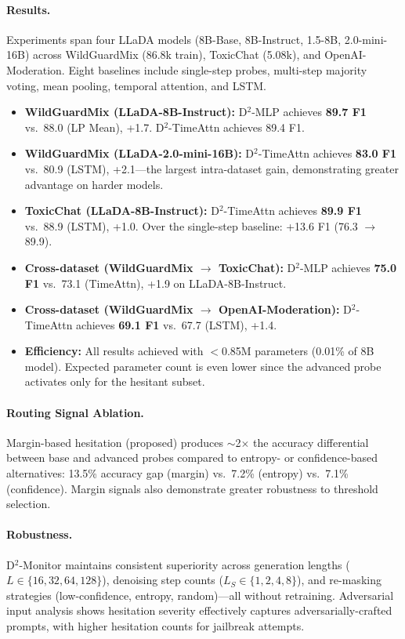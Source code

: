 \documentclass[11pt,a4paper]{article}
\begin{document}
\paragraph{Results.}
Experiments span four LLaDA models (8B-Base, 8B-Instruct, 1.5-8B, 2.0-mini-16B) across WildGuardMix (86.8k train), ToxicChat (5.08k), and OpenAI-Moderation. Eight baselines include single-step probes, multi-step majority voting, mean pooling, temporal attention, and LSTM.

\begin{itemize}[nosep]
    \item \textbf{WildGuardMix (LLaDA-8B-Instruct):} D$^2$-MLP achieves \textbf{89.7 F1} vs.\ 88.0 (LP Mean), +1.7. D$^2$-TimeAttn achieves 89.4 F1.
    \item \textbf{WildGuardMix (LLaDA-2.0-mini-16B):} D$^2$-TimeAttn achieves \textbf{83.0 F1} vs.\ 80.9 (LSTM), +2.1---the largest intra-dataset gain, demonstrating greater advantage on harder models.
    \item \textbf{ToxicChat (LLaDA-8B-Instruct):} D$^2$-TimeAttn achieves \textbf{89.9 F1} vs.\ 88.9 (LSTM), +1.0. Over the single-step baseline: +13.6 F1 (76.3 $\to$ 89.9).
    \item \textbf{Cross-dataset (WildGuardMix $\to$ ToxicChat):} D$^2$-MLP achieves \textbf{75.0 F1} vs.\ 73.1 (TimeAttn), +1.9 on LLaDA-8B-Instruct.
    \item \textbf{Cross-dataset (WildGuardMix $\to$ OpenAI-Moderation):} D$^2$-TimeAttn achieves \textbf{69.1 F1} vs.\ 67.7 (LSTM), +1.4.
    \item \textbf{Efficiency:} All results achieved with $<$0.85M parameters (0.01\% of 8B model). Expected parameter count is even lower since the advanced probe activates only for the hesitant subset.
\end{itemize}

\paragraph{Routing Signal Ablation.}
Margin-based hesitation (proposed) produces $\sim$2$\times$ the accuracy differential between base and advanced probes compared to entropy- or confidence-based alternatives: 13.5\% accuracy gap (margin) vs.\ 7.2\% (entropy) vs.\ 7.1\% (confidence). Margin signals also demonstrate greater robustness to threshold selection.

\paragraph{Robustness.}
D$^2$-Monitor maintains consistent superiority across generation lengths ($L \in \{16, 32, 64, 128\}$), denoising step counts ($L_S \in \{1, 2, 4, 8\}$), and re-masking strategies (low-confidence, entropy, random)---all without retraining. Adversarial input analysis shows hesitation severity effectively captures adversarially-crafted prompts, with higher hesitation counts for jailbreak attempts.
\end{document}
